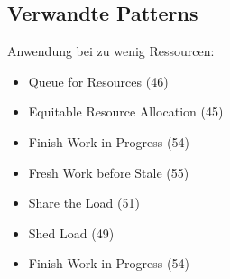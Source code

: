 \subsection{Verwandte Patterns}

Anwendung bei zu wenig Ressourcen:
\begin{itemize}
	\item Queue for Resources (46)
	\item Equitable Resource Allocation (45)
	\item Finish Work in Progress (54)
\end{itemize}

\begin{itemize}
	\item Fresh Work before Stale (55)
	\item Share the Load (51)
	\item Shed Load (49)
	\item Finish Work in Progress (54)
\end{itemize}

